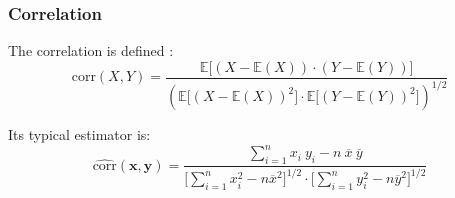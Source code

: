 

\frame
{
\frametitle{Correlation}
The correlation is defined :
$$ 
\mathrm{corr}(X,Y)=\frac{\mathbb{E}\lbrack (X -\mathbb{E}(X)) \cdot (Y -\mathbb{E}(Y))\rbrack }{\left( \mathbb{E} \lbrack (X -\mathbb{E}(X))^2 \rbrack  \cdot \mathbb{E} \lbrack (Y -\mathbb{E}(Y))^2 \rbrack \right)^{1/2}}
$$ 

Its typical estimator is:
$$
\widehat{\mathrm{corr}}(\mathbf{x},\mathbf{y})=\frac{\sum_{i=1}^{n} x_i\ y_i - n\ \overline{x}\ \overline{y}}{\lbrack \sum_{i=1}^{n}x_i^2-n\overline{x}^2 \rbrack^{1/2}\cdot \lbrack\sum_{i=1}^{n} y_i^2-n \overline{y}^2 \rbrack^{1/2} }
$$

}
